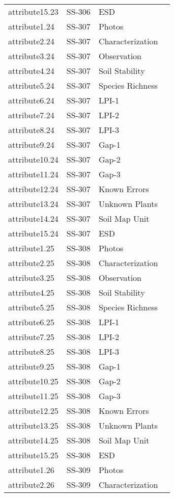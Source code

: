 \documentclass[
]{article}
\begin{document}
\begin{longtable}[]{@{}llll@{}}
attribute15.23 & SS-306 & ESD & \\
attribute1.24 & SS-307 & Photos & \\
attribute2.24 & SS-307 & Characterization & \\
attribute3.24 & SS-307 & Observation & \\
attribute4.24 & SS-307 & Soil Stability & \\
attribute5.24 & SS-307 & Species Richness & \\
attribute6.24 & SS-307 & LPI-1 & \\
attribute7.24 & SS-307 & LPI-2 & \\
attribute8.24 & SS-307 & LPI-3 & \\
attribute9.24 & SS-307 & Gap-1 & \\
attribute10.24 & SS-307 & Gap-2 & \\
attribute11.24 & SS-307 & Gap-3 & \\
attribute12.24 & SS-307 & Known Errors & \\
attribute13.24 & SS-307 & Unknown Plants & \\
attribute14.24 & SS-307 & Soil Map Unit & \\
attribute15.24 & SS-307 & ESD & \\
attribute1.25 & SS-308 & Photos & \\
attribute2.25 & SS-308 & Characterization & \\
attribute3.25 & SS-308 & Observation & \\
attribute4.25 & SS-308 & Soil Stability & \\
attribute5.25 & SS-308 & Species Richness & \\
attribute6.25 & SS-308 & LPI-1 & \\
attribute7.25 & SS-308 & LPI-2 & \\
attribute8.25 & SS-308 & LPI-3 & \\
attribute9.25 & SS-308 & Gap-1 & \\
attribute10.25 & SS-308 & Gap-2 & \\
attribute11.25 & SS-308 & Gap-3 & \\
attribute12.25 & SS-308 & Known Errors & \\
attribute13.25 & SS-308 & Unknown Plants & \\
attribute14.25 & SS-308 & Soil Map Unit & \\
attribute15.25 & SS-308 & ESD & \\
attribute1.26 & SS-309 & Photos & \\
attribute2.26 & SS-309 & Characterization & \\

\end{longtable}
\end{document}
